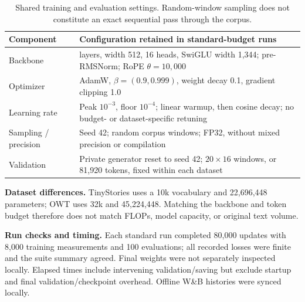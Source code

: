 \begin{table}[htbp]
    \centering\small
    \begin{tabular}{@{}l>{\raggedright\arraybackslash}p{}@{}}
        \toprule
        Component & Configuration retained in standard-budget runs \\
        \midrule
        Backbone & 4 layers, width 512, 16 heads, SwiGLU width 1,344;
            pre-RMSNorm; RoPE $\theta=10{,}000$ \\
        \addlinespace
        Optimizer & AdamW, $\beta=(0.9,0.999)$, weight decay 0.1,
            gradient clipping 1.0 \\
        \addlinespace
        Learning rate & Peak $10^{-3}$, floor $10^{-4}$; linear warmup,
            then cosine decay; no budget- or dataset-specific retuning \\
        \addlinespace
        Sampling / precision & Seed 42; random corpus windows; FP32,
            without mixed precision or compilation \\
        \addlinespace
        Validation & Private generator reset to seed 42; $20\times16$
            windows, or 81,920 tokens, fixed within each dataset \\
        \bottomrule
    \end{tabular}
    \caption{Shared training and evaluation settings. Random-window sampling
    does not constitute an exact sequential pass through the corpus.}
    \label{tab:standard_shared_settings}
\end{table}
\FloatBarrier

\textbf{Dataset differences.}
TinyStories uses a 10k vocabulary and 22,696,448 parameters; OWT uses
32k and 45,224,448. Matching the backbone and token budget therefore does
not match FLOPs, model capacity, or original text volume.

\textbf{Run checks and timing.}
Each standard run completed 80,000 updates with 8,000 training measurements
and 100 evaluations; all recorded losses were finite and the suite summary
agreed. Final weights were not separately inspected locally. Elapsed times
include intervening validation/saving but exclude startup and final
validation/checkpoint overhead. Offline W\&B histories were synced locally.
